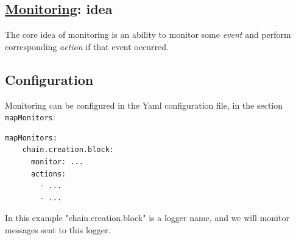 \begin{mdframed}
\section*{\href{https://github.com/input-output-hk/iohk-monitoring-framework/blob/master/iohk-monitoring/src/Cardano/BM/Backend/Monitoring.lhs}{Monitoring}: idea}

    The core idea of monitoring is an ability to monitor some \textit{event} and perform corresponding \textit{action} if that event occurred.
\end{mdframed}

\begin{mdframed}
\section*{Configuration}

Monitoring can be configured in the Yaml configuration file, in the section \texttt{mapMonitors}:

\begin{lstlisting}[language=bash]
  mapMonitors:
    chain.creation.block:
      monitor: ...
      actions:
        - ...
        - ...
\end{lstlisting}

In this example "chain.creation.block" is a logger name, and we will monitor messages sent to this logger.

\end{mdframed}

